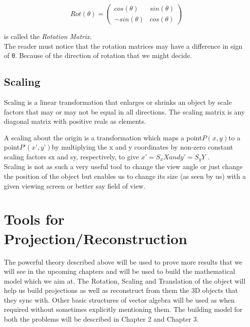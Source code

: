 \documentclass[12pt]{report}
\begin{document}
\[ Rot(\theta) = \begin{pmatrix}
cos(\theta) & sin(\theta) \\
-sin(\theta) & cos(\theta)
\end{pmatrix} \]

is called the \textit{Rotation Matrix}.\\


The reader must notice that the rotation matrices may have a difference in sign of θ. Because of the direction of rotation that we might decide.\\

\subsection{Scaling}

Scaling is a linear transformation that enlarges or shrinks an object by scale factors that may or may not be equal in all directions. The scaling matrix is any diagonal matrix with positive reals as elements.\\
\vspace{0.3cm}

A scaling about the origin is a transformation which maps a point$ P(x, y) $to a point$ P’ (x’ , y’ ) $by multiplying the x and y coordinates by non-zero constant scaling factors sx and sy, respectively, to give $ x’ = S_{x} X and y’ = S_{y} Y$ .
\vspace{0.3cm}
\\
Scaling is not as such a very useful tool to change the view angle or just change the position of the object but enables us to change its size (as seen by us) with a given viewing screen or better say field of view.

\section{Tools for Projection/Reconstruction}

The powerful theory described above will be used to prove more results that we will see in the upcoming chapters and will be used to build the mathematical model which we aim at. The Rotation, Scaling and Translation of the object will help us build projections as well as reconstruct from them the 3D objects that they sync with. Other basic structures of vector algebra will be used as when required without sometimes explicitly mentioning them. The building model for both the problems will be described in Chapter 2 and Chapter 3.\\
\end{document}

